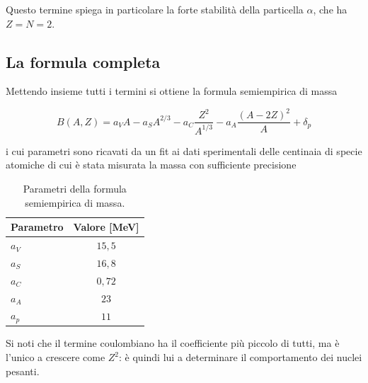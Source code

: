 Questo termine spiega in particolare la forte stabilità della particella $\alpha$, che ha $Z = N = 2$.

\subsection{La formula completa}

Mettendo insieme tutti i termini si ottiene la formula semiempirica di massa
%
\begin{tcolorbox}[colback=black!5!white, colframe=black!45!white, boxrule=0.8pt]
\begin{equation}
    B(A,Z) = a_V A - a_S A^{2/3} - a_C \frac{Z^2}{A^{1/3}} - a_A \frac{(A-2Z)^2}{A} + \delta_p
    \label{eq:semf}
\end{equation}
\end{tcolorbox}
i cui parametri sono ricavati da un fit ai dati sperimentali delle centinaia di specie atomiche di cui è stata misurata la massa con sufficiente precisione

\begin{table}[htbp]
\centering
\begin{tabular}{lc}
\hline
Parametro & Valore [MeV] \\
\hline
$a_V$ & $15,5$ \\
$a_S$ & $16,8$ \\
$a_C$ & $0,72$ \\
$a_A$ & $23$ \\
$a_p$ & $11$ \\
\hline
\end{tabular}
\caption{Parametri della formula semiempirica di massa.}
\label{tab:parametri_semf}
\end{table}

Si noti che il termine coulombiano ha il coefficiente più piccolo di tutti, ma è l'unico a crescere come $Z^2$: è quindi lui a determinare il comportamento dei nuclei pesanti. 

